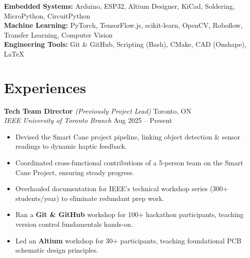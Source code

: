 \documentclass[10pt,letterpaper]{article}
\begin{document}
\hspace{0.75em}\textbf{Embedded Systems:} 
    Arduino, ESP32, Altium Designer, KiCad, Soldering,
    MicroPython, CircuitPython \\

\hspace{0.75em}\textbf{Machine Learning:} 
PyTorch, TensorFlow.js, scikit-learn, OpenCV, Roboflow, 
Transfer Learning, Computer Vision \\

\hspace{0.75em}\textbf{Engineering Tools:} 
Git \& GitHub, Scripting (Bash), CMake, CAD (Onshape), LaTeX \\







\section{Experiences}

\textbf{Tech Team Director} \textit{(Previously Project Lead)} \hfill 
Toronto, ON \\
\textit{IEEE University of Toronto Branch} \hfill
Aug 2025 -- Present \\
\begin{itemize}
    \item Devised the Smart Cane project pipeline, linking object detection \& sensor readings to dynamic haptic feedback. 
    \item Coordinated cross-functional contributions of a 5-person team on the Smart Cane Project, ensuring steady progress. 
    \item Overhauled documentation for IEEE's technical workshop series (300+ students/year) to eliminate redundant prep work.
    \item Ran a \textbf{Git \& GitHub} workshop for 100+ hackathon participants, teaching version control fundamentals hands-on.
    \item Led an \textbf{Altium} workshop for 30+ participants, teaching foundational PCB schematic design principles.
\end{itemize}
\end{document}
